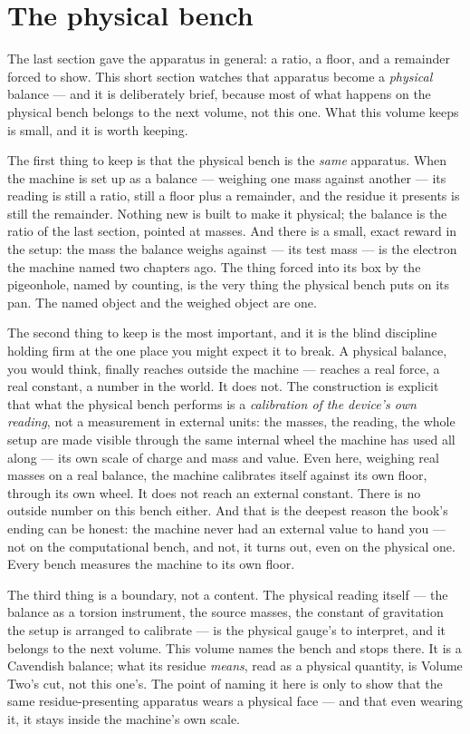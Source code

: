 \section{The physical bench}

The last section gave the apparatus in general: a ratio, a floor, and a remainder forced to show. This short section
watches that apparatus become a \emph{physical} balance --- and it is deliberately brief, because most of what happens
on the physical bench belongs to the next volume, not this one. What this volume keeps is small, and it is worth
keeping.

The first thing to keep is that the physical bench is the \emph{same} apparatus. When the machine is set up as a
balance --- weighing one mass against another --- its reading is still a ratio, still a floor plus a remainder, and the
residue it presents is still the remainder. Nothing new is built to make it physical; the balance is the ratio of the
last section, pointed at masses. And there is a small, exact reward in the setup: the mass the balance weighs against
--- its test mass --- is the electron the machine named two chapters ago. The thing forced into its box by the
pigeonhole, named by counting, is the very thing the physical bench puts on its pan. The named object and the weighed
object are one.

The second thing to keep is the most important, and it is the blind discipline holding firm at the one place you might
expect it to break. A physical balance, you would think, finally reaches outside the machine --- reaches a real force,
a real constant, a number in the world. It does not. The construction is explicit that what the physical bench performs
is a \emph{calibration of the device's own reading}, not a measurement in external units: the masses, the reading, the
whole setup are made visible through the same internal wheel the machine has used all along --- its own scale of
charge and mass and value. Even here, weighing real masses on a real balance, the machine calibrates itself against its
own floor, through its own wheel. It does not reach an external constant. There is no outside number on this bench
either. And that is the deepest reason the book's ending can be honest: the machine never had an external value to hand
you --- not on the computational bench, and not, it turns out, even on the physical one. Every bench measures the
machine to its own floor.

The third thing is a boundary, not a content. The physical reading itself --- the balance as a torsion instrument, the
source masses, the constant of gravitation the setup is arranged to calibrate --- is the physical gauge's to interpret,
and it belongs to the next volume. This volume names the bench and stops there. It is a Cavendish balance; what its
residue \emph{means}, read as a physical quantity, is Volume Two's cut, not this one's. The point of naming it here is
only to show that the same residue-presenting apparatus wears a physical face --- and that even wearing it, it stays
inside the machine's own scale.


